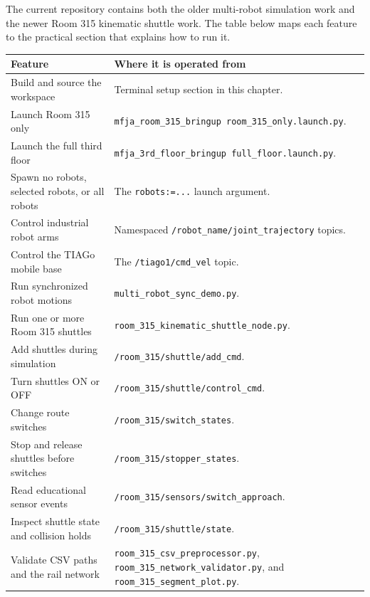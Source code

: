 \documentclass[12pt,a4paper]{report}
\begin{document}
The current repository contains both the older multi-robot simulation work and
the newer Room 315 kinematic shuttle work. The table below maps each feature to
the practical section that explains how to run it.

\begingroup
\small
\begin{longtable}{@{}p{}p{}@{}}
\toprule
Feature & Where it is operated from \\
\midrule
\endhead
Build and source the workspace & Terminal setup section in this chapter. \\
\addlinespace
Launch Room 315 only & \texttt{mfja\_room\_315\_bringup room\_315\_only.launch.py}. \\
\addlinespace
Launch the full third floor & \texttt{mfja\_3rd\_floor\_bringup full\_floor.launch.py}. \\
\addlinespace
Spawn no robots, selected robots, or all robots &
The \texttt{robots:=...} launch argument. \\
\addlinespace
Control industrial robot arms &
Namespaced \texttt{/robot\_name/joint\_trajectory} topics. \\
\addlinespace
Control the TIAGo mobile base &
The \texttt{/tiago1/cmd\_vel} topic. \\
\addlinespace
Run synchronized robot motions &
\texttt{multi\_robot\_sync\_demo.py}. \\
\addlinespace
Run one or more Room 315 shuttles &
\texttt{room\_315\_kinematic\_shuttle\_node.py}. \\
\addlinespace
Add shuttles during simulation &
\texttt{/room\_315/shuttle/add\_cmd}. \\
\addlinespace
Turn shuttles ON or OFF &
\texttt{/room\_315/shuttle/control\_cmd}. \\
\addlinespace
Change route switches &
\texttt{/room\_315/switch\_states}. \\
\addlinespace
Stop and release shuttles before switches &
\texttt{/room\_315/stopper\_states}. \\
\addlinespace
Read educational sensor events &
\texttt{/room\_315/sensors/switch\_approach}. \\
\addlinespace
Inspect shuttle state and collision holds &
\texttt{/room\_315/shuttle/state}. \\
\addlinespace
Validate CSV paths and the rail network &
\texttt{room\_315\_csv\_preprocessor.py},
\texttt{room\_315\_network\_validator.py}, and
\texttt{room\_315\_segment\_plot.py}. \\
\bottomrule
\end{longtable}
\endgroup
\end{document}
